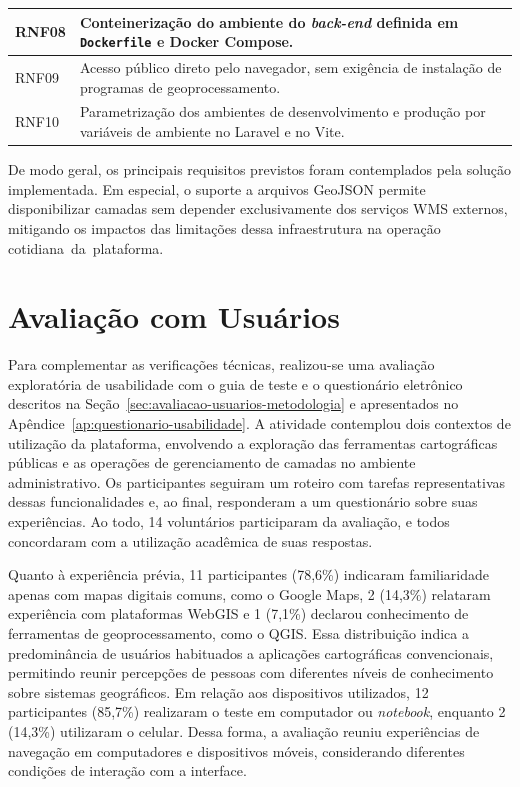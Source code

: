 \begin{table}[!htbp]
{\begin{tabular}{
            >{\raggedright\arraybackslash}p{1.5cm}
            >{\raggedright\arraybackslash}p{12.9cm}
        }
            RNF08 &
            Conteinerização do ambiente do \textit{back-end} definida em \texttt{Dockerfile} e Docker Compose. \\
            \midrule

            RNF09 &
            Acesso público direto pelo navegador, sem exigência de instalação de programas de geoprocessamento. \\
            \midrule

            RNF10 &
            Parametrização dos ambientes de desenvolvimento e produção por variáveis de ambiente no Laravel e no Vite. \\

            \bottomrule
        \end{tabular}
    }{
    }
\end{table}

\FloatBarrier
De modo geral, os principais requisitos previstos foram contemplados pela solução implementada. Em especial, o suporte a arquivos GeoJSON permite disponibilizar camadas sem depender exclusivamente dos serviços WMS externos, mitigando os impactos das limitações dessa infraestrutura na operação cotidiana~da~plataforma.


\section{Avaliação com Usuários}
\label{sec:avaliacao-usuarios}

Para complementar as verificações técnicas, realizou-se uma avaliação exploratória de usabilidade com o guia de teste e o questionário eletrônico descritos na Seção~\ref{sec:avaliacao-usuarios-metodologia} e apresentados no Apêndice~\ref{ap:questionario-usabilidade}. A atividade contemplou dois contextos de utilização da plataforma, envolvendo a exploração das ferramentas cartográficas públicas e as operações de gerenciamento de camadas no ambiente administrativo. Os participantes seguiram um roteiro com tarefas representativas dessas funcionalidades e, ao final, responderam a um questionário sobre suas experiências. Ao todo, 14 voluntários participaram da avaliação, e todos concordaram com a utilização acadêmica de suas respostas.

Quanto à experiência prévia, 11 participantes (78,6\%) indicaram familiaridade apenas com mapas digitais comuns, como o Google Maps, 2 (14,3\%) relataram experiência com plataformas WebGIS e 1 (7,1\%) declarou conhecimento de ferramentas de geoprocessamento, como o QGIS. Essa distribuição indica a predominância de usuários habituados a aplicações cartográficas convencionais, permitindo reunir percepções de pessoas com diferentes níveis de conhecimento sobre sistemas geográficos. Em relação aos dispositivos utilizados, 12 participantes (85,7\%) realizaram o teste em computador ou \textit{notebook}, enquanto 2 (14,3\%) utilizaram o celular. Dessa forma, a avaliação reuniu experiências de navegação em computadores e dispositivos móveis, considerando diferentes condições de interação com a interface.

